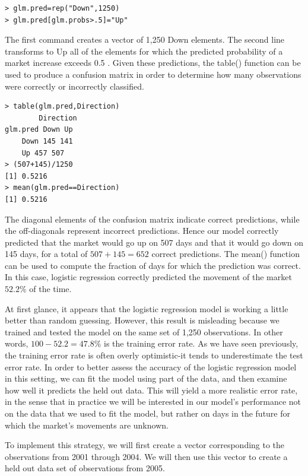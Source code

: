\documentclass[10pt]{article}
\begin{document}
\begin{verbatim}
> glm.pred=rep("Down",1250)
> glm.pred[glm.probs>.5]="Up"
\end{verbatim}

The first command creates a vector of 1,250 Down elements. The second line transforms to Up all of the elements for which the predicted probability of a market increase exceeds 0.5 . Given these predictions, the table() function can be used to produce a confusion matrix in order to determine how many observations were correctly or incorrectly classified.

\begin{verbatim}
> table(glm.pred,Direction)
        Direction
glm.pred Down Up
    Down 145 141
    Up 457 507
> (507+145)/1250
[1] 0.5216
> mean(glm.pred==Direction)
[1] 0.5216
\end{verbatim}

The diagonal elements of the confusion matrix indicate correct predictions, while the off-diagonals represent incorrect predictions. Hence our model correctly predicted that the market would go up on 507 days and that it would go down on 145 days, for a total of $507+145=652$ correct predictions. The mean() function can be used to compute the fraction of days for which the prediction was correct. In this case, logistic regression correctly predicted the movement of the market $52.2 \%$ of the time.

At first glance, it appears that the logistic regression model is working a little better than random guessing. However, this result is misleading because we trained and tested the model on the same set of 1,250 observations. In other words, $100-52.2=47.8 \%$ is the training error rate. As we have seen previously, the training error rate is often overly optimistic-it tends to underestimate the test error rate. In order to better assess the accuracy of the logistic regression model in this setting, we can fit the model using part of the data, and then examine how well it predicts the held out data. This will yield a more realistic error rate, in the sense that in practice we will be interested in our model's performance not on the data that we used to fit the model, but rather on days in the future for which the market's movements are unknown.

To implement this strategy, we will first create a vector corresponding to the observations from 2001 through 2004. We will then use this vector to create a held out data set of observations from 2005.
\end{document}
